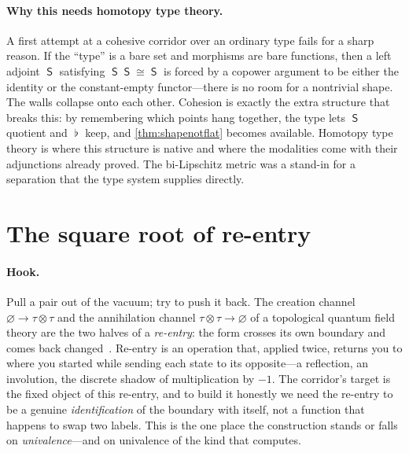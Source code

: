 \documentclass[11pt,letterpaper]{article}
\theoremstyle{plain}
\theoremstyle{definition}
\theoremstyle{remark}
\newcommand{\shapeM}{\mathop{\mathsf{S}}\nolimits}      %
\newcommand{\flatM}{\mathop{\flat}\nolimits}            %
\begin{document}
\paragraph{Why this needs homotopy type theory.}
A first attempt at a cohesive corridor over an ordinary type fails for a sharp
reason. If the ``type'' is a bare set and morphisms are bare functions, then a
left adjoint $\shapeM$ satisfying $\shapeM\shapeM\cong\shapeM$ is forced by a
copower argument to be either the identity or the constant-empty functor---there
is no room for a nontrivial shape. The walls collapse onto each other. Cohesion is
exactly the extra structure that breaks this: by remembering which points hang
together, the type lets $\shapeM$ quotient and $\flatM$ keep, and
\cref{thm:shapenotflat} becomes available. Homotopy type theory is where this
structure is native and where the modalities come with their adjunctions already
proved. The bi-Lipschitz metric was a stand-in for a separation that
the type system supplies directly.

\section{The square root of re-entry}\label{sec:univalence}

\paragraph{Hook.}
Pull a pair out of the vacuum; try to push it back. The creation channel
$\varnothing\to\tau\otimes\tau$ and the annihilation channel
$\tau\otimes\tau\to\varnothing$ of a topological quantum field theory are the two
halves of a \emph{re-entry}: the form crosses its own boundary and comes back
changed~\citep{kock2004,iaom_quantum_atlas}. Re-entry is an operation that, applied
twice, returns you to where you started while sending each state to its
opposite---a reflection, an involution, the discrete shadow of multiplication by
$-1$. The corridor's target is the fixed object of this re-entry, and to build it
honestly we need the re-entry to be a genuine \emph{identification} of the
boundary with itself, not a function that happens to swap two labels. This is the
one place the construction stands or falls on \emph{univalence}---and on
univalence of the kind that computes.
\end{document}
